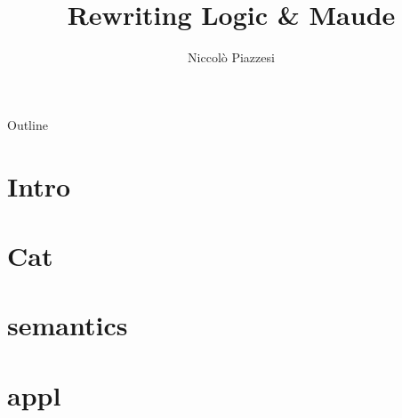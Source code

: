 \documentclass{beamer}
\title{Rewriting Logic \& Maude}
\author{Niccolò Piazzesi}
\institute{
    Università degli studi di Pisa
}
\begin{document}
\frame{\titlepage}

\begin{frame}{Outline}
    \tableofcontents[hideallsubsections]
\end{frame}
\section{Intro}
\section{Cat}
\section{semantics}
\section{appl}
\end{document}
